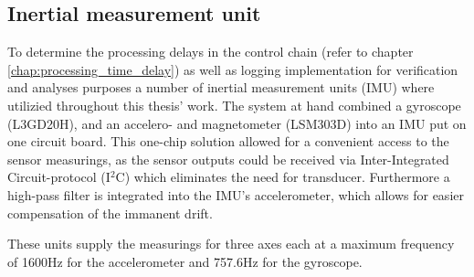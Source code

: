 \documentclass[ExampleMasters.tex]{subfiles}
\begin{document}
\subsection{Inertial measurement unit}
\label{sec:IMU}
To determine the processing delays in the control chain (refer to chapter \ref{chap:processing_time_delay}) as well as logging implementation for verification and analyses purposes a number of inertial measurement units (IMU) where utilizied throughout this thesis' work. The system at hand combined a gyroscope (L3GD20H), and an accelero- and magnetometer (LSM303D) into an IMU put on one circuit board\cite{IMU_homepage_shop}. This one-chip solution allowed for a convenient access to the sensor measurings, as the sensor outputs could be received via Inter-Integrated Circuit-protocol (I$^{2}$C)  which eliminates the need for transducer. Furthermore a high-pass filter is integrated into the IMU's accelerometer, which allows for easier compensation of the immanent drift. 

These units supply the measurings for three axes each at a maximum frequency of 1600Hz for the accelerometer and 757.6Hz for the gyroscope. \cite{accelerometer_datasheet}\cite{gyrometer_datasheet}
\end{document}
